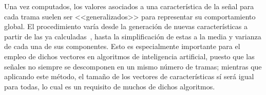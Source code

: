 Una vez computados, los valores asociados a una característica de la señal para cada trama suelen ser <<generalizados>> para representar su comportamiento global.
El procedimiento varía desde la generación de nuevas características a partir de las ya calculadas~\cite{Giret11}, hasta la simplificación de estas a la media y varianza de cada una de sus componentes.
Esto es especialmente importante para el empleo de dichos vectores en algoritmos de inteligencia artificial, puesto que las señales no siempre se descomponen en un mismo número de tramas;
mientras que aplicando este método, el tamaño de los vectores de características sí será igual para todas, lo cual es un requisito de muchos de dichos algoritmos.